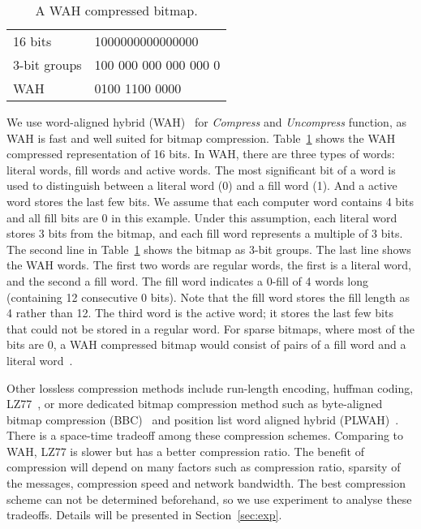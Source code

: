 \documentclass[conference]{IEEEtran}
\begin{document}
\begin{table}[t]
  \caption{A WAH compressed bitmap.}
  \label{table:wah-example}
  \begin{center}
    \begin{tabular}{ll}
\hline
      16 bits & 1000000000000000 \\
      3-bit groups & 100 000 000 000 000 0\\
      WAH & 0100 1100 0000\\
      \hline
    \end{tabular}
  \end{center}
\end{table}
We use word-aligned hybrid (WAH)~\cite{Wu:WAH} for \textit{Compress} and
\textit{Uncompress} function, as WAH is fast and well suited for bitmap
compression. Table~\ref{table:wah-example} shows the WAH compressed
representation of 16 bits. In WAH, there are three types of words: literal
words, fill words and active words. The most significant bit of a word is used
to distinguish between a literal word (0) and a fill word (1). And a active
word stores the last few bits. We assume that each computer word contains 4
bits and all fill bits are 0 in this example. Under this assumption, each
literal word stores 3 bits from the bitmap, and each fill word represents a
multiple of 3 bits. The second line in Table~\ref{table:wah-example} shows the
bitmap as 3-bit groups. The last line shows the WAH words. The first two words
are regular words, the first is a literal word, and the second a fill
word. The fill word  indicates a 0-fill of 4 words long (containing 12
consecutive 0 bits). Note that the fill word stores the fill length as 4
rather than 12. The third word is the active word; it stores the last few bits
that could not be stored in a regular word. For sparse bitmaps, where most of
the bits are 0, a WAH compressed bitmap would consist of pairs of a fill word
and a literal word~\cite{Wu:WAH}.

Other lossless compression methods include run-length encoding, huffman
coding, LZ77~\cite{lz77}, or more dedicated bitmap compression method such as
byte-aligned bitmap compression (BBC)~\cite{Antoshenkov:1995:BBC} and position
list word aligned hybrid (PLWAH)~\cite{Deliege:2010:PLWAH}. There is a
space-time tradeoff among these compression schemes. Comparing to WAH, LZ77 is
slower but has a better compression ratio. The benefit of compression will
depend on many factors such as compression ratio, sparsity of the messages,
compression speed and network bandwidth. The best compression scheme can not
be determined beforehand, so we use experiment to analyse these
tradeoffs. Details will be presented in Section~\ref{sec:exp}.
\end{document}
